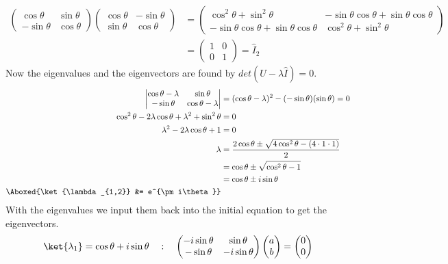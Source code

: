 \documentclass{article}
\begin{document}
	\begin{align*}
 		\begin{pmatrix}
 			\cos \theta & \sin \theta \\
 			-\sin \theta & \cos \theta 
 		\end{pmatrix}
 		\begin{pmatrix}
 			\cos \theta & -\sin \theta \\
 			\sin \theta & \cos \theta 
 		\end{pmatrix}
 		&= \begin{pmatrix}
 			\cos^2 \theta + \sin^2 \theta & -\sin \theta \cos \theta + \sin \theta \cos \theta \\
 			-\sin \theta \cos \theta + \sin \theta \cos \theta & \cos^2 \theta + \sin^2 \theta 
 		\end{pmatrix} \\
 		&= \begin{pmatrix}
 			1 & 0 \\
 			0 & 1 
 		\end{pmatrix} = \hat{I}_2
	\end{align*}
	Now the eigenvalues and the eigenvectors are found by $det(U-\lambda\hat{I}) = 0$.
	\begin{align*}
		\begin{vmatrix}
			\cos \theta - \lambda & \sin \theta \\
			-\sin \theta & \cos \theta - \lambda
		\end{vmatrix}
		&= (\cos \theta - \lambda)^2 - (-\sin \theta)(\sin \theta) = 0 \\
		\cos^2 \theta - 2\lambda\cos\theta + \lambda^2 + \sin^2 \theta &= 0 \\
		\lambda^2 - 2\lambda\cos\theta + 1 &= 0 \\
		\lambda &= \frac{2\cos\theta \pm \sqrt{4\cos^2\theta - (4\cdot1\cdot1)}}{2} \\
		&= \cos\theta \pm \sqrt{\cos^2\theta -1} \\
		&= \cos\theta \pm i\sin\theta \\
		\Aboxed{\ket{\lambda_{1,2}} &= e^{\pm i\theta}}
	\end{align*}
	With the eigenvalues we input them back into the initial equation to get the eigenvectors.
	\begin{align*}
		\ket{\lambda_1} = \cos \theta + i \sin \theta \quad : \quad
		\begin{pmatrix}
			-i\sin \theta & \sin \theta \\
			-\sin \theta & -i\sin \theta 
		\end{pmatrix}
		\begin{pmatrix}
			a \\
			b
		\end{pmatrix}
		= \begin{pmatrix}
			0 \\
			0
		\end{pmatrix}
	\end{align*}
\end{document}
